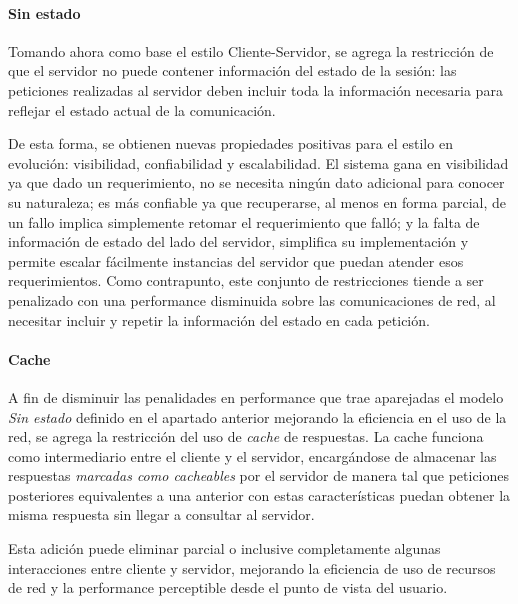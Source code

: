\paragraph{Sin estado}

Tomando ahora como base el estilo Cliente-Servidor, se agrega la restricción de que el servidor no puede contener información del estado de la sesión\cite[Sec.~3.4.3]{tesis:fielding}: las peticiones realizadas al servidor deben incluir toda la información necesaria para reflejar el estado actual de la comunicación.

De esta forma, se obtienen nuevas propiedades positivas para el estilo en evolución: visibilidad, confiabilidad y escalabilidad. El sistema gana en visibilidad ya que dado un requerimiento, no se necesita ningún dato adicional para conocer su naturaleza; es más confiable ya que recuperarse, al menos en forma parcial, de un fallo implica simplemente retomar el requerimiento que falló; y la falta de información de estado del lado del servidor, simplifica su implementación y permite escalar fácilmente instancias del servidor que puedan atender esos requerimientos. Como contrapunto, este conjunto de restricciones tiende a ser penalizado con una performance disminuida sobre las comunicaciones de red, al necesitar incluir y repetir la información del estado en cada petición.


\paragraph{Cache}

A fin de disminuir las penalidades en performance que trae aparejadas el modelo \textit{Sin estado} definido en el apartado anterior mejorando la eficiencia en el uso de la red, se agrega la restricción del uso de \textit{cache} de respuestas\cite[Sec.3.4.4]{tesis:fielding}. La cache funciona como intermediario entre el cliente y el servidor, encargándose de almacenar las respuestas \textit{marcadas como cacheables} por el servidor de manera tal que peticiones posteriores equivalentes a una anterior con estas características puedan obtener la misma respuesta sin llegar a consultar al servidor.

Esta adición puede eliminar parcial o inclusive completamente algunas interacciones entre cliente y servidor, mejorando la eficiencia de uso de recursos de red y la performance perceptible desde el punto de vista del usuario.

